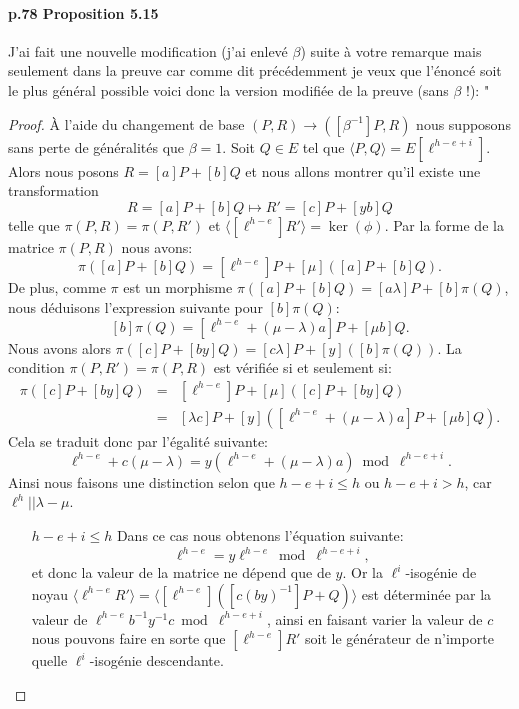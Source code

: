 \documentclass[10pt,a4paper]{article}
\theoremstyle{plain}
\theoremstyle{definition}
\theoremstyle{definition}
\theoremstyle{definition}
\theoremstyle{definition}
\theoremstyle{definition}
\theoremstyle{remark}
\theoremstyle{remark}
\theoremstyle{definition}
\begin{document}
\paragraph{p.78 Proposition 5.15}{J'ai fait une nouvelle modification (j'ai enlevé $\beta$) suite à votre remarque mais seulement dans la preuve car comme dit précédemment je veux que l'énoncé soit le plus général possible voici donc la version modifiée de la preuve (sans $\beta$ !): 
"
\begin{proof}%
\`A l'aide du changement de base $(P,R) \rightarrow ([\beta^{-1}]P,R)$ nous 
supposons sans perte de généralités que $\beta =1$.
Soit $Q \in E$ tel que $\langle P,Q \rangle = E[\ell^{h-e+i}]$. 
Alors nous posons $R=[a]P+[b]Q$ et nous allons montrer qu'il existe une 
transformation \begin{equation*}
R=[a]P+[b]Q \mapsto R'=[c]P+[yb]Q
\end{equation*}
telle que $\pi(P,R)=\pi(P,R')$ et $\langle [\ell^{h-e}]R' \rangle = \ker(\phi)$.
\newline
Par la forme de la matrice $\pi(P,R)$ nous avons:
\[ \pi([a]P+[b]Q)=[\ell^{h-e}] P + [\mu] ([a]P+[b]Q).\]
De plus, comme $\pi$ est un morphisme $\pi([a]P+[b]Q)=[a \lambda ]P + [b] 
\pi(Q)$, nous déduisons l'expression suivante pour $[b]\pi(Q)$:
\[ [b] \pi(Q)=[\ell^{h-e} + (\mu - \lambda)a]P + [\mu b] Q. \]
Nous avons alors $\pi([c]P+[by]Q)=[c\lambda]P+[y]([b]\pi(Q))$. La condition 
$\pi(P,R')=\pi(P,R)$ est vérifiée si et seulement si:
\begin{eqnarray*}
\pi([c]P+[by]Q) &=& [\ell^{h-e}] P + [\mu]([c]P+[by]Q) \\
				&=& [\lambda c]P + [y]([\ell^{h-e} + (\mu - \lambda)a]P + [\mu b] Q).
\end{eqnarray*}
Cela se traduit donc par l'égalité suivante:
\[ \ell^{h-e} + c(\mu-\lambda)=y(\ell^{h-e}+(\mu - \lambda )a) \bmod \ell^{h-e+i}. \]
Ainsi nous faisons une distinction selon que $h-e+i \leqslant h$ ou 
$h-e+i > h$, car $\ell^h || \lambda - \mu$. 

\begin{itemize}
\item[$h-e+i \leqslant h$] %
Dans ce cas nous obtenons l'équation suivante:
\[ \ell^{h-e} = y \ell^{h-e}  \bmod \ell^{h-e+i}, \]
et donc la valeur de la matrice ne dépend que de $y$. Or la
$\ell^i$-isogénie de noyau $\langle \ell^{h-e}R' \rangle= \langle [\ell^{h-e}]
([c(by)^{-1}]P+Q) \rangle$ est déterminée par la 
valeur de $\ell^{h-e}b^{-1}y^{-1}c \bmod \ell^{h-e+i}$, ainsi en faisant 
varier la valeur de $c$ nous pouvons faire en sorte que $[\ell^{h-e}]R'$ soit le 
générateur de n'importe quelle $\ell^{i}$-isogénie descendante.


\end{itemize}
\end{proof}}
\end{document}

